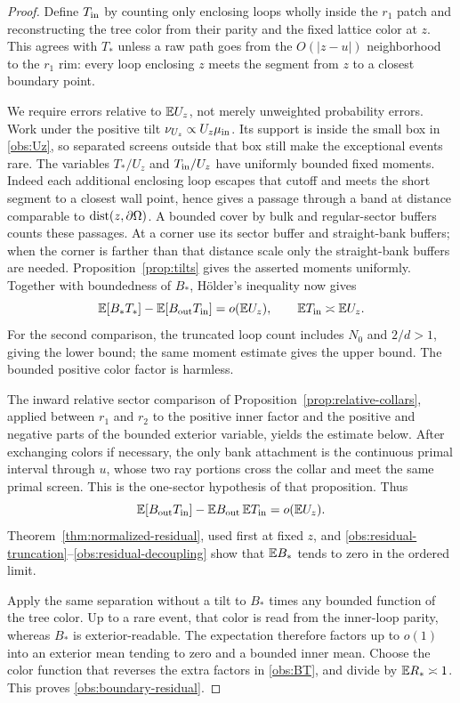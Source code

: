 \begin{proof}
Define $T_{\rm in}$ by counting only enclosing loops wholly inside
the $r_1$ patch and reconstructing the tree color from their parity
and the fixed lattice color at $z$.  This agrees with $T_*$ unless a
raw path goes from the $O(|z-u|)$ neighborhood to the $r_1$ rim:
every loop enclosing $z$ meets the segment from $z$ to a closest
boundary point.

We require errors relative to $\mathbb E U_z$, not merely unweighted
probability errors.  Work under the positive tilt
$\nu_{U_z}\propto U_z\mu_{\rm in}$.  Its support is inside the
small box in \eqref{obs:Uz}, so separated screens outside that box
still make the exceptional events rare.  The variables
$T_*/U_z$ and $T_{\rm in}/U_z$ have uniformly bounded fixed moments.
Indeed each additional enclosing loop escapes that cutoff and meets
the short segment to a closest wall point, hence gives a passage
through a band at distance comparable to $\operatorname{dist}(z,\partial\Omega)$.
A bounded cover by bulk and regular-sector buffers counts these
passages.  At a corner use its sector buffer and straight-bank
buffers; when the corner is farther than that distance scale only
the straight-bank buffers are needed.  Proposition~\ref{prop:tilts}
gives the asserted moments uniformly.  Together with boundedness of
$B_*$, H\"older's inequality now gives
\begin{equation}
 \mathbb E[B_*T_*]-\mathbb E[B_{\rm out}T_{\rm in}]
       =o(\mathbb E U_z),
 \qquad \mathbb E T_{\rm in}\asymp\mathbb E U_z.
 \label{obs:residual-truncation}
\end{equation}
For the second comparison, the truncated loop count includes $N_0$
and $2/d>1$, giving the lower bound; the same moment estimate gives
the upper bound.  The bounded positive color factor is harmless.

The inward relative sector comparison of
Proposition~\ref{prop:relative-collars}, applied between $r_1$ and
$r_2$ to the positive inner factor and the positive and negative
parts of the bounded exterior variable, yields the estimate below.
After exchanging colors if necessary, the only bank attachment is
the continuous primal interval through $u$, whose two ray portions
cross the collar and meet the same primal screen.  This is the
one-sector hypothesis of that proposition.  Thus
\begin{equation}
 \mathbb E[B_{\rm out}T_{\rm in}]
 -\mathbb E B_{\rm out}\,\mathbb E T_{\rm in}=o(\mathbb E U_z).
 \label{obs:residual-decoupling}
\end{equation}
Theorem~\ref{thm:normalized-residual}, used first at fixed $z$,
and \eqref{obs:residual-truncation}--\eqref{obs:residual-decoupling}
show that $\mathbb E B_*$ tends to zero in the ordered limit.

Apply the same separation without a tilt to $B_*$ times any bounded
function of the tree color.  Up to a rare event, that color is read
from the inner-loop parity, whereas $B_*$ is exterior-readable.
The expectation therefore factors up to $o(1)$ into an exterior
mean tending to zero and a bounded inner mean.  Choose the color
function that reverses the extra factors in \eqref{obs:BT}, and
divide by $\mathbb E R_*\asymp1$.  This proves
\eqref{obs:boundary-residual}.
\end{proof}

